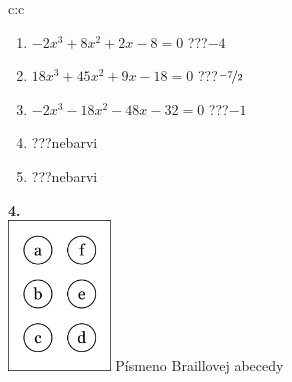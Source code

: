 \documentclass[10pt]{report}
\begin{document}
\begin{tabular}{c:c}
\begin{minipage}[c][104.5mm][t]{0.5\linewidth}
\begin{center}
\begin{minipage}{0.79\linewidth}
\begin{center}
\begin{varwidth}{\linewidth}
\begin{enumerate}
\item $-2x^3+8x^2+2x-8=0$\quad \dotfill\; ???\;\dotfill \quad $-4$
\item $18x^3+45x^2+9x-18=0$\quad \dotfill\; ???\;\dotfill \quad $\nicefrac{-7}{2}$
\item $-2x^3-18x^2-48x-32=0$\quad \dotfill\; ???\;\dotfill \quad $-1$
\item \quad \dotfill\; ???\;\dotfill \quad nebarvi
\item \quad \dotfill\; ???\;\dotfill \quad nebarvi
\end{enumerate}
\end{varwidth}
\end{center}
\end{minipage}
\begin{minipage}{0.20\linewidth}
\begin{center}
{\Huge\bfseries 4.} \\[2mm]
\includegraphics[height=40mm]{../images/braille.png}
{\small Písmeno Braillovej abecedy}
\end{center}
\end{minipage}
\end{center}
\end{minipage}
%
\end{tabular}
\newpage
\thispagestyle{empty}
\end{document}

